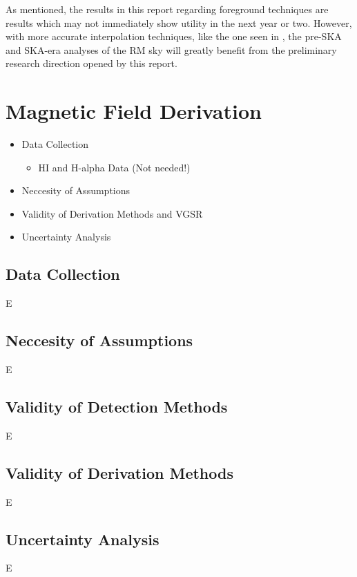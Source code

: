 As mentioned, the results in this report regarding foreground techniques are results which may not immediately show utility in the next year or two. However, with more accurate interpolation techniques, like the one seen in \cite{ID58}, the pre-SKA and SKA-era analyses of the RM sky will greatly benefit from the preliminary research direction opened by this report.

\section{Magnetic Field Derivation}
\label{sec:mag_disc}

\begin{itemize}
    \item Data Collection
    \begin{itemize}
        \item HI and H-alpha Data (Not needed!)
    \end{itemize}
    \item Neccesity of Assumptions
    \item Validity of Derivation Methods and VGSR
    \item Uncertainty Analysis
\end{itemize}

\subsection{Data Collection}
\label{ssec:B1}

E

\subsection{Neccesity of Assumptions}
\label{ssec:B2}

E

\subsection{Validity of Detection Methods}
\label{ssec:B5}

E

\subsection{Validity of Derivation Methods}
\label{ssec:B3}

E

\subsection{Uncertainty Analysis}
\label{ssec:B4}

E
